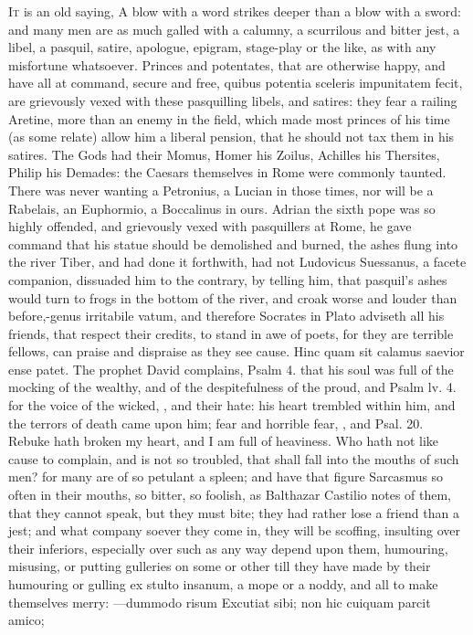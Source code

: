 {{\lettrine{I}{t} is an old saying, A blow with a word strikes deeper than a
blow with a sword: and many men are as much galled with a calumny, a
scurrilous and bitter jest, a libel, a pasquil, satire, apologue,
epigram, stage-play or the like, as with any misfortune whatsoever.
Princes and potentates, that are otherwise happy, and have all at
command, secure and free, quibus potentia sceleris impunitatem fecit,
are grievously vexed with these pasquilling libels, and satires: they
fear a railing Aretine, more than an enemy in the field, which
made most princes of his time (as some relate) allow him a liberal
pension, that he should not tax them in his satires. The Gods had
their Momus, Homer his Zoilus, Achilles his Thersites, Philip his
Demades: the Caesars themselves in Rome were commonly taunted. There
was never wanting a Petronius, a Lucian in those times, nor will be a
Rabelais, an Euphormio, a Boccalinus in ours. Adrian the sixth pope
was so highly offended, and grievously vexed with pasquillers at
Rome, he gave command that his statue should be demolished and burned,
the ashes flung into the river Tiber, and had done it forthwith, had
not Ludovicus Suessanus, a facete companion, dissuaded him to the
contrary, by telling him, that pasquil's ashes would turn to frogs in
the bottom of the river, and croak worse and louder than before,-genus
irritabile vatum, and therefore Socrates in Plato adviseth all
his friends, that respect their credits, to stand in awe of poets, for
they are terrible fellows, can praise and dispraise as they see cause.
Hinc quam sit calamus saevior ense patet. The prophet David complains,
Psalm  4. that his soul was full of the mocking of the wealthy,
and of the despitefulness of the proud, and Psalm lv. 4. for the voice
of the wicked, \etc{}, and their hate: his heart trembled within him, and
the terrors of death came upon him; fear and horrible fear, \etc{}, and
Psal.  20. Rebuke hath broken my heart, and I am full of
heaviness. Who hath not like cause to complain, and is not so troubled,
that shall fall into the mouths of such men? for many are of so
petulant a spleen; and have that figure Sarcasmus so often in
their mouths, so bitter, so foolish, as Balthazar Castilio notes
of them, that they cannot speak, but they must bite; they had rather
lose a friend than a jest; and what company soever they come in, they
will be scoffing, insulting over their inferiors, especially over such
as any way depend upon them, humouring, misusing, or putting gulleries
on some or other till they have made by their humouring or gulling
ex stulto insanum, a mope or a noddy, and all to make themselves
merry:
---dummodo risum
Excutiat sibi; non hic cuiquam parcit amico;

}}
